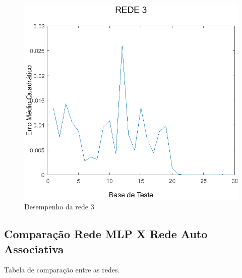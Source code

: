 \begin{figure}[H]

\centering %
\includegraphics{04-Figuras/MSE_DesempenhoNet3}

\caption{Desempenho da rede 3}

\label{figura:rede3}

\end{figure}



\subsection{Comparação Rede MLP X Rede Auto Associativa}

Tabela de comparação entre as redes.


